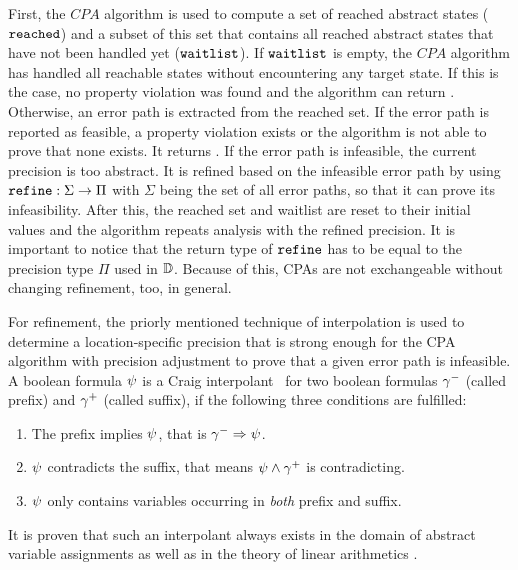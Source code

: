 First, the $CPA$ algorithm is used to compute a set of reached abstract states ($\texttt{reached}$) and a subset of this set that contains all reached abstract states that have not been handled yet ($\texttt{waitlist}$).
If $\texttt{waitlist}$ is empty, the $CPA$ algorithm has handled all reachable states without encountering any target state.
If this is the case, no property violation was found and the algorithm can return \safe.
Otherwise, an error path is extracted from the reached set.
If the error path is reported as feasible, a property violation exists or the algorithm is not able to prove that none exists. It returns \unsafe.
If the error path is infeasible, the current precision is too abstract.
It is refined based on the infeasible error path by using $\texttt{refine} : \Sigma \rightarrow \Pi$ with $\Sigma$ being the set of all error paths, so that it can prove its infeasibility.
After this, the reached set and waitlist are reset to their initial values and the algorithm repeats analysis with the refined precision.
It is important to notice that the return type of $\texttt{refine}$ has to be equal to the precision type $\Pi$ used in $\mathbb{D}$.
Because of this, CPAs are not exchangeable without changing refinement, too, in general.

For refinement, the priorly mentioned technique of interpolation is used to determine a location-specific precision that is strong enough for the CPA algorithm with precision adjustment to prove that a given error path is infeasible.
A boolean formula $\psi$ is a Craig interpolant \cite{Craig1957}\ for two boolean formulas ${\gamma^{-}}$ (called prefix) and ${\gamma^{+}}$ (called suffix), if the following three conditions are fulfilled:
\begin{enumerate}[label=\alph*)]
\item The prefix implies $\psi$, that is ${\gamma^{-}} \Rightarrow \psi$.
\item $\psi$ contradicts the suffix, that means $\psi \wedge {\gamma^{+}}$ is contradicting.
\item $\psi$ only contains variables occurring in \emph{both} prefix and suffix.
\end{enumerate}
It is proven that such an interpolant always exists in the domain of abstract variable assignments \cite{Beyer2013} as well as in the theory of linear arithmetics \cite{Craig1957}.

